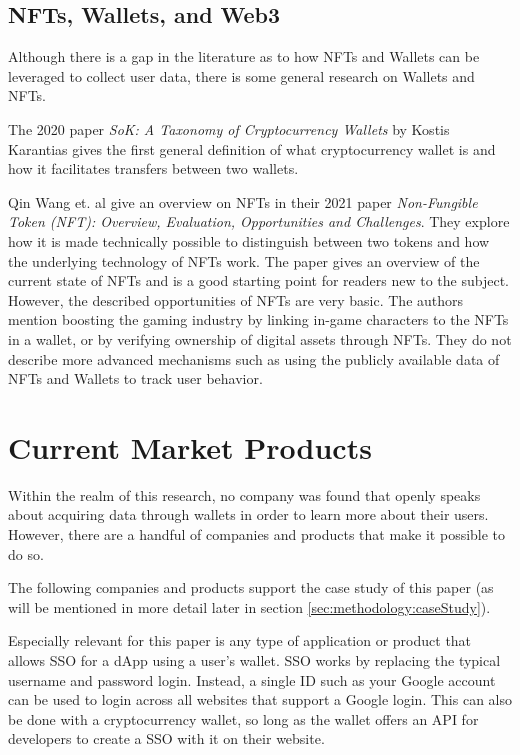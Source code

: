 \subsection{NFTs, Wallets, and Web3}
\label{sec:sota:nfts}
Although there is a gap in the literature as to how NFTs and Wallets can be leveraged to collect user data, there is some general research on Wallets and NFTs.

The 2020 paper \textit{SoK: A Taxonomy of Cryptocurrency Wallets} by Kostis Karantias gives the first general definition of what cryptocurrency wallet is and how it facilitates transfers between two wallets. \cite{wallets1}

Qin Wang et. al give an overview on NFTs in their 2021 paper \textit{Non-Fungible Token (NFT): Overview, Evaluation, Opportunities and Challenges}. They explore how it is made technically possible to distinguish between two tokens and how the underlying technology of NFTs work. The paper gives an overview of the current state of NFTs and is a good starting point for readers new to the subject. However, the described opportunities of NFTs are very basic. The authors mention boosting the gaming industry by linking in-game characters to the NFTs in a wallet, or by verifying ownership of digital assets through NFTs. They do not describe more advanced mechanisms such as using the publicly available data of NFTs and Wallets to track user behavior.



%
%
\section{Current Market Products}
\label{sec:sota:products}
Within the realm of this research, no company was found that openly speaks about acquiring data through wallets in order to learn more about their users. However, there are a handful of companies and products that make it possible to do so.

The following companies and products support the case study  of this paper (as will be mentioned in more detail later in section \ref{sec:methodology:caseStudy}).

Especially relevant for this paper is any type of application or product that allows SSO for a dApp using a user's wallet. SSO works by replacing the typical username and password login. Instead, a single ID such as your Google account can be used to login across all websites that support a Google login. This can also be done with a cryptocurrency wallet, so long as the wallet offers an API for developers to create a SSO with it on their website.

